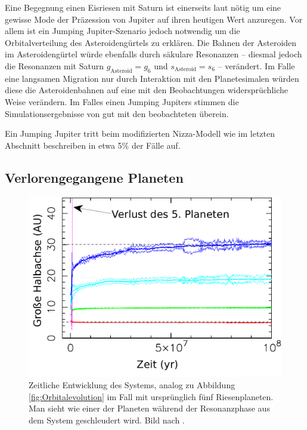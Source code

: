 \documentclass[12pt,a4paper,twoside]{article}
\renewcommand{\cite}{\citep}
\begin{document}
Eine Begegnung einen Eisriesen mit Saturn ist einerseits laut \cite{Morbidelli2009} nötig um eine gewisse Mode der Präzession von Jupiter auf ihren heutigen Wert anzuregen. %
Vor allem ist ein Jumping Jupiter-Szenario jedoch notwendig um die Orbitalverteilung des Asteroidengürtels zu erklären\cite{Morbidelli2010}. Die Bahnen der Asteroiden im Asteroidengürtel würde ebenfalls durch säkulare Resonanzen -- diesmal jedoch die Resonanzen mit Saturn $g_\mathrm{Asteroid}=g_6$ und $s_\mathrm{Asteroid}=s_6$ -- verändert. Im Falle eine langsamen Migration nur durch Interaktion mit den Planetesimalen würden diese die Asteroidenbahnen auf eine mit den Beobachtungen widersprüchliche Weise verändern. Im Falles einen Jumping Jupiters stimmen die Simulationsergebnisse von \cite{Morbidelli2010} gut mit den beobachteten überein.

Ein Jumping Jupiter tritt beim modifizierten Nizza-Modell wie im letzten Abschnitt beschreiben in etwa 5\% der Fälle auf\cite{Brasser2009}.

\subsection{Verlorengegangene Planeten}
\begin{figure}[tbhn]
\centering
\includegraphics[scale=0.5]{img/Nesvorny2011-1.pdf}
\caption{Zeitliche Entwicklung des Systems, analog zu Abbildung \ref{fig:Orbitalevolution} im Fall mit ursprünglich fünf Riesenplaneten. Man sieht wie einer der Planeten während der Resonanzphase aus dem System geschleudert wird. Bild nach \cite{Nesvorny2011}. }
\label{fig:5planeten}
\end{figure}
\end{document}
